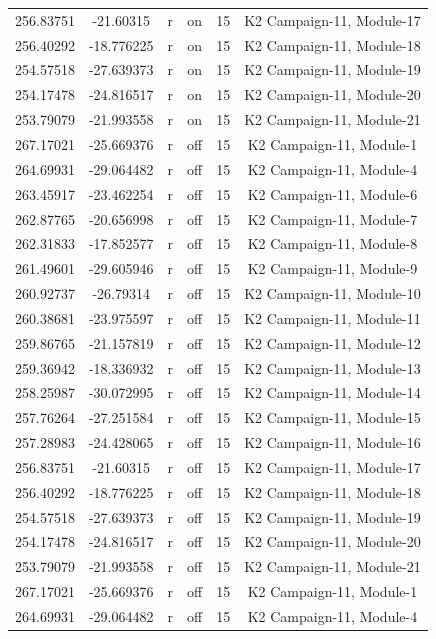 \documentclass[11pt]{article}
\begin{document}
\begin{center}
\begin{longtable}{|c|c|c|c|c|c|}
256.83751 & -21.60315 & r & on &15 & K2 Campaign-11, Module-17\\
256.40292 & -18.776225 & r & on &15 & K2 Campaign-11, Module-18\\
254.57518 & -27.639373 & r & on &15 & K2 Campaign-11, Module-19\\
254.17478 & -24.816517 & r & on &15 & K2 Campaign-11, Module-20\\
253.79079 & -21.993558 & r & on &15 & K2 Campaign-11, Module-21\\
267.17021 & -25.669376 & r & off &15 & K2 Campaign-11, Module-1\\
264.69931 & -29.064482 & r & off &15 & K2 Campaign-11, Module-4\\
263.45917 & -23.462254 & r & off &15 & K2 Campaign-11, Module-6\\
262.87765 & -20.656998 & r & off &15 & K2 Campaign-11, Module-7\\
262.31833 & -17.852577 & r & off &15 & K2 Campaign-11, Module-8\\
261.49601 & -29.605946 & r & off &15 & K2 Campaign-11, Module-9\\
260.92737 & -26.79314 & r & off &15 & K2 Campaign-11, Module-10\\
260.38681 & -23.975597 & r & off &15 & K2 Campaign-11, Module-11\\
259.86765 & -21.157819 & r & off &15 & K2 Campaign-11, Module-12\\
259.36942 & -18.336932 & r & off &15 & K2 Campaign-11, Module-13\\
258.25987 & -30.072995 & r & off &15 & K2 Campaign-11, Module-14\\
257.76264 & -27.251584 & r & off &15 & K2 Campaign-11, Module-15\\
257.28983 & -24.428065 & r & off &15 & K2 Campaign-11, Module-16\\
256.83751 & -21.60315 & r & off &15 & K2 Campaign-11, Module-17\\
256.40292 & -18.776225 & r & off &15 & K2 Campaign-11, Module-18\\
254.57518 & -27.639373 & r & off &15 & K2 Campaign-11, Module-19\\
254.17478 & -24.816517 & r & off &15 & K2 Campaign-11, Module-20\\
253.79079 & -21.993558 & r & off &15 & K2 Campaign-11, Module-21\\
267.17021 & -25.669376 & r & off &15 & K2 Campaign-11, Module-1\\
264.69931 & -29.064482 & r & off &15 & K2 Campaign-11, Module-4\\

\end{longtable}
\end{center}
\end{document}
